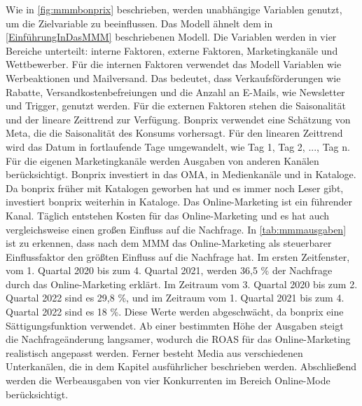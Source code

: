 Wie in \autoref{fig:mmmbonprix} beschrieben, werden unabhängige Variablen genutzt, um die Zielvariable  zu beeinflussen. Das Modell ähnelt dem in \autoref{EinführungInDasMMM} beschriebenen Modell. Die Variablen werden in vier Bereiche unterteilt: interne Faktoren, externe Faktoren, Marketingkanäle und Wettbewerber. Für die internen Faktoren verwendet das Modell Variablen wie Werbeaktionen und Mailversand. Das bedeutet, dass Verkaufsförderungen wie Rabatte, Versandkostenbefreiungen und die Anzahl an E-Mails, wie Newsletter und Trigger, genutzt werden. Für die externen Faktoren stehen die Saisonalität und der lineare Zeittrend zur Verfügung. Bonprix verwendet eine Schätzung von Meta, die die Saisonalität des Konsums vorhersagt. Für den linearen Zeittrend wird das Datum in fortlaufende Tage umgewandelt, wie Tag 1, Tag 2, ..., Tag n. Für die eigenen Marketingkanäle werden Ausgaben von anderen Kanälen berücksichtigt. Bonprix investiert in das \ac{OMA}, in Medienkanäle und in Kataloge. Da bonprix früher mit Katalogen geworben hat und es immer noch Leser gibt, investiert bonprix weiterhin in Kataloge. Das Online-Marketing ist ein führender Kanal. Täglich entstehen Kosten für das Online-Marketing und es hat auch vergleichsweise einen großen Einfluss auf die Nachfrage. In 
\autoref{tab:mmmausgaben} ist zu erkennen, dass nach dem \ac{MMM} das Online-Marketing als steuerbarer Einflussfaktor den größten Einfluss auf die Nachfrage hat. Im ersten Zeitfenster, vom 1. Quartal 2020 bis zum 4. Quartal 2021, werden 36,5 \% der Nachfrage durch das Online-Marketing erklärt. Im Zeitraum vom 3. Quartal 2020 bis zum 2. Quartal 2022 sind es 29,8 \%, und im Zeitraum vom 1. Quartal 2021 bis zum 4. Quartal 2022 sind es 18 \%. Diese Werte werden abgeschwächt, da bonprix eine Sättigungsfunktion verwendet. Ab einer bestimmten Höhe der Ausgaben steigt die Nachfrageänderung langsamer, wodurch die ROAS für das Online-Marketing realistisch angepasst werden. Ferner besteht Media aus verschiedenen Unterkanälen, die in dem Kapitel  ausführlicher beschrieben werden. Abschließend werden die Werbeausgaben von vier Konkurrenten im Bereich Online-Mode berücksichtigt.\\\\
